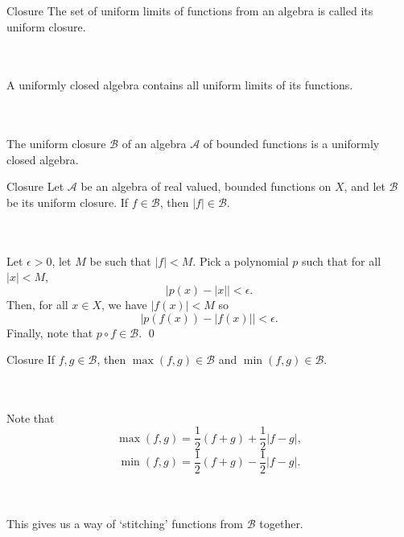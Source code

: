 \documentclass{beamer}
\begin{document}
    \begin{frame}{Closure}
        The set of uniform limits of functions from an algebra is called its uniform
        closure.
        
        \\~\\

        A uniformly closed algebra contains all uniform limits of its functions.

        \\~\\

        The uniform closure $\mathscr{B}$ of an algebra $\mathscr{A}$ of bounded
        functions is a uniformly closed algebra.
    \end{frame}
    
    \begin{frame}{Closure}
        Let $\mathscr{A}$ be an algebra of real valued, bounded functions on $X$, and
        let $\mathscr{B}$ be its uniform closure. If $f \in \mathscr{B}$, then $|f|
        \in \mathscr{B}$.

        \\~\\

        Let $\epsilon > 0$, let $M$ be such that $|f| < M$. Pick a polynomial $p$
        such that for all $|x| < M$, \[
            |p(x) - |x| | < \epsilon.
        \] Then, for all $x \in X$, we have $|f(x)| < M$ so \[
            |p(f(x)) - |f(x)| | < \epsilon.
        \] Finally, note that $p\circ f \in \mathscr{B}$. \hfill\qed
    \end{frame}

    \begin{frame}{Closure}
        If $f, g \in \mathscr{B}$, then $\max(f, g) \in \mathscr{B}$ and $\min(f, g)
        \in \mathscr{B}$.

        \\~\\

        Note that \[
            \max(f, g) = \frac{1}{2}(f + g) + \frac{1}{2}|f - g|,
        \] \[
            \min(f, g) = \frac{1}{2}(f + g) - \frac{1}{2}|f - g|. \tag*{\qed}
        \]

        \\~\\

        This gives us a way of `stitching' functions from $\mathscr{B}$ together.
    \end{frame}
\end{document}
